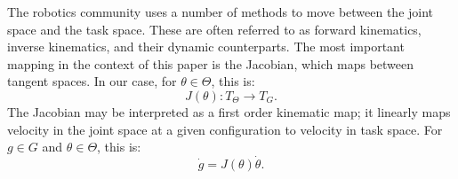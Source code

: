 \documentclass[10pt,conference]{ieeeconf}
\begin{document}
The robotics community uses a number of methods to move between the joint space and the task space.
These are often referred to as forward kinematics, inverse kinematics, and their dynamic counterparts.
The most important mapping in the context of this paper is the Jacobian, which maps between tangent spaces. In our case, for $\theta \in \Theta$, this is:
\begin{equation}
    J(\theta): T_\Theta \to T_G.
\end{equation}
The Jacobian may be interpreted as a first order kinematic map; it linearly maps velocity in the joint space at a given configuration to velocity in task space.
For $g\in G$ and $\theta \in \Theta$, this is:
\begin{equation}\label{eqn:jforward}
    \dot{g} = J(\theta)\dot{\theta}.
\end{equation}
\end{document}
